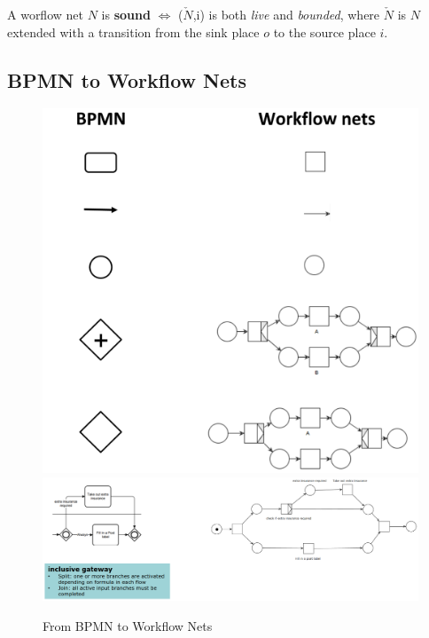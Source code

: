 \begin{theorem}   
   A worflow net $N$ is \textbf{sound} $\Longleftrightarrow$ ($\check{N}$,{i}) is both \textit{live} and \textit{bounded}, where $\check{N}$ is $N$ extended with a transition from the sink place $o$ to the source place $i$.
\end{theorem}
\subsection{BPMN to Workflow Nets}

\begin{figure}[htbp]
   \centering
   \includegraphics[width=0.5\columnwidth]{images/bpm_net1.png}
   \includegraphics{images/bpm_net2.png}
   \caption{From BPMN to Workflow Nets}
   \label{fig:bpm_net}
\end{figure}